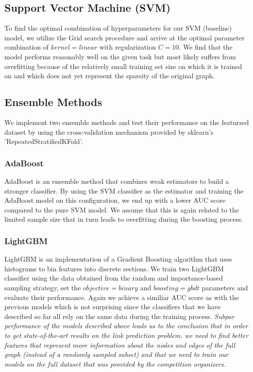 \documentclass[11pt, oneside]{article}
\begin{document}
\subsection{Support Vector Machine (SVM)}
\label{sec:svm}
\vspace{-5pt}
To find the optimal combination of hyperparameters for our SVM (baseline) model, we utilize the Grid search procedure and arrive at the optimal parameter combination of $kernel=linear$ with regularization $C=10$. We find that the model performs reasonably well on the given task but most likely suffers from overfitting because of the relatively small training set size on which it is trained on and which does not yet represent the sparsity of the original graph.
\vspace{-10pt}
\subsection{Ensemble Methods}
\label{sec:ensemble}
\vspace{-5pt}
We  implement two ensemble methods and test their performance on the featurzed dataset by using the cross-validation mechanism provided by sklearn's 'RepeatedStratifiedKFold'.
\vspace{-10pt}
\subsubsection{AdaBoost}
\vspace{-5pt}
AdaBoost is an ensemble method that combines weak estimators to build a stronger classifier. By using the SVM classifier as the estimator and training the AdaBoost model on this configuration, we end up with a lower AUC score compared to the pure SVM model. We assume that this is again related to the limited sample size that in turn leads to overfitting during the boosting process.
\vspace{-10pt}
\subsubsection{LightGBM}
\vspace{-5pt}
LightGBM \cite{lightgbm} is an implementation of a Gradient Boosting algorithm that uses histograms to bin features into discrete sections. We train two LightGBM classifier using the data obtained from the random and importance-based sampling strategy, set the $objective=binary$ and $boosting=gbdt$ parameters and evaluate their performance. Again we achieve a similiar AUC score as with the previous models which is not surprising since the classifiers that we have described so far all rely on the same data during the training process.
\vspace{5pt}
\newline
\textit{Subpar performance of the models described above leads us to the conclusion that in order to get state-of-the-art results on the link prediction problem. we need to find better features that represent more information about the nodes and edges of the full graph (instead of a randomly sampled subset) and that we need to train our models on the full dataset that was provided by the competition organizers.}
\vspace{-10pt}
\end{document}
